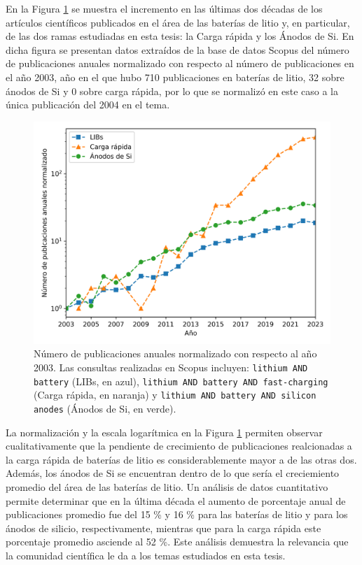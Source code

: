 En la Figura \ref{fig:scopus} se muestra el incremento en las últimas dos décadas
de los artículos científicos publicados en el área de las baterías de litio y, en 
particular, de las dos ramas estudiadas en esta tesis: la Carga rápida y los 
Ánodos de Si. En dicha figura se presentan datos extraídos de la base de datos 
Scopus \cite{SCOPUS} del número de publicaciones anuales normalizado con respecto 
al número de publicaciones en el año 2003, año en el que hubo 710 publicaciones 
en baterías de litio, 32 sobre ánodos de Si y 0 sobre carga rápida, por lo que 
se normalizó en este caso a la única publicación del 2004 en el tema.
\begin{figure}[h!]
    \centering
    \includegraphics[width=.8\textwidth]{Introduccion/scopus.png}
    \caption{Número de publicaciones anuales normalizado con respecto al año 2003. 
    Las consultas realizadas en Scopus \cite{SCOPUS} incluyen: 
    \texttt{lithium AND battery} (LIBs, en azul), \texttt{lithium AND battery AND 
    fast-charging} (Carga rápida, en naranja) y \texttt{lithium AND battery AND 
    silicon anodes} (Ánodos de Si, en verde).}
    \label{fig:scopus}
\end{figure}
La normalización y la escala logarítmica en la Figura \ref{fig:scopus} permiten
observar cualitativamente que la pendiente de crecimiento de publicaciones 
realcionadas a la carga rápida de baterías de litio es considerablemente mayor a 
de las otras dos. Además, los ánodos de Si se encuentran dentro de lo que sería
el creciemiento promedio del área de las baterías de litio. Un análisis de datos
cuantitativo permite determinar que en la última década el aumento de porcentaje
anual de publicaciones promedio fue del 15 \% y 16 \% para las baterías de litio 
y para los ánodos de silicio, respectivamente, mientras que para la carga rápida 
este porcentaje promedio asciende al 52 \%. Este análisis demuestra la relevancia
que la comunidad científica le da a los temas estudiados en esta tesis.



